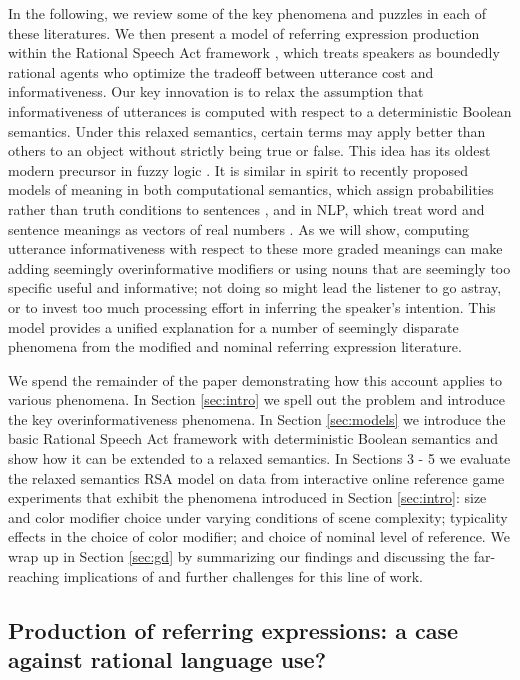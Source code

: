 \documentclass[11pt]{article}
\newcommand{\sectionref}[1]{Section \ref{#1}}
\begin{document}
In the following, we review some of the key phenomena and puzzles in each of these literatures. We then present a model of referring expression production within the Rational Speech Act framework \cite{frank2012, goodman2016, FrankeJaeger2016}, which treats speakers as boundedly rational agents who optimize the tradeoff between utterance cost and informativeness. Our key innovation is to relax the assumption that informativeness of utterances is computed with respect to a deterministic Boolean semantics. Under this relaxed semantics, certain terms may apply better than others to an object without strictly being true or false. This idea has its oldest modern precursor in fuzzy logic \cite{zadeh1965fuzzy}. It is similar in spirit  to recently proposed models of meaning in both computational semantics, which assign probabilities rather than truth conditions to sentences \cite{Bernardy2018}, and in NLP, which treat word and sentence meanings  as vectors of real numbers \cite{pennington2014glove, peters2018deep, devlin2018bert}.  As we will show, computing utterance informativeness with respect to these more graded meanings can make adding seemingly overinformative modifiers or using nouns that are seemingly too specific useful and informative; not doing so might lead the listener to go astray, or to invest too much processing effort in inferring the speaker's  intention. This model provides a unified explanation for a number of seemingly disparate phenomena from the modified and nominal referring expression literature. 

We spend the remainder of the paper demonstrating how this account applies to various phenomena. In \sectionref{sec:intro} we spell out the problem and introduce the key overinformativeness phenomena. In \sectionref{sec:models} we introduce the basic Rational Speech Act framework with deterministic Boolean semantics and show how it can be extended to a relaxed semantics. In Sections 3 - 5 we evaluate the relaxed semantics RSA model on data from interactive online reference game experiments that exhibit the phenomena introduced in \sectionref{sec:intro}: size and color modifier choice under varying conditions of scene complexity; typicality effects in the choice of color modifier; and choice of nominal level of reference. We wrap up in \sectionref{sec:gd} by summarizing our findings and discussing the far-reaching implications of and further challenges for this line of work.

\subsection{Production of referring expressions: a case against rational language use?}
\end{document}
